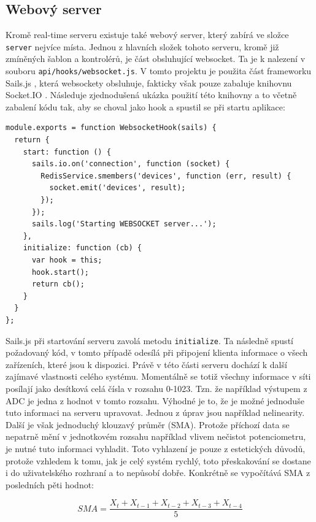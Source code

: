 \subsection{Webový server}
Kromě real-time serveru existuje také webový server, který zabírá ve složce \texttt{server} nejvíce místa. Jednou z hlavních složek tohoto serveru, kromě již zmíněných šablon a kontrolérů, je část obsluhující websocket. Ta je k nalezení v souboru \texttt{api/hooks/websocket.js}. V tomto projektu je použita část frameworku Sails.js \cite{sails}, která websockety obsluhuje, fakticky však pouze zabaluje knihovnu Socket.IO \cite{socket}. Následuje zjednodušená ukázka použití této knihovny a to včetně zabalení kódu tak, aby se choval jako hook a spustil se při startu aplikace:

\begin{verbatim}
module.exports = function WebsocketHook(sails) {
  return {
    start: function () {
      sails.io.on('connection', function (socket) {
        RedisService.smembers('devices', function (err, result) {
          socket.emit('devices', result);
        });
      });
      sails.log('Starting WEBSOCKET server...');
    },
    initialize: function (cb) {
      var hook = this;
      hook.start();
      return cb();
    }
  }
};
\end{verbatim}

Sails.js při startování serveru zavolá metodu \texttt{initialize}. Ta následně spustí požadovaný kód, v tomto případě odesílá při připojení klienta informace o všech zařízeních, které jsou k dispozici. Právě v této části serveru dochází k další zajímavé vlastnosti celého systému. Momentálně se totiž všechny informace v síti posílají jako desítková celá čísla v rozsahu 0-1023. Tzn. že například výstupem z ADC je jedna z hodnot v tomto rozsahu. Výhodné je to, že je možné jednoduše tuto informaci na serveru upravovat. Jednou z úprav jsou například nelinearity. Další je však jednoduchý klouzavý průměr (SMA). Protože příchozí data se nepatrně mění v jednotkovém rozsahu například vlivem nečistot potenciometru, je nutné tuto informaci vyhladit. Toto vyhlazení je pouze z estetických důvodů, protože vzhledem k tomu, jak je celý systém rychlý, toto přeskakování se dostane i do uživatelského rozhraní a to nepůsobí dobře. Konkrétně se vypočítává SMA z posledních pěti hodnot:

\begin{equation}
	SMA = \dfrac{X_t + X_{t-1} + X_{t-2} + X_{t-3} + X_{t-4}}{5}
	\label{eq:sma}
\end{equation}

